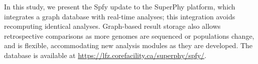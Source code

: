 \documentclass{article}
\begin{document}

In this study, we present the Spfy update to the SuperPhy platform, which integrates a graph database with real-time analyses; this integration avoids recomputing identical analyses. Graph-based result storage also allows retrospective comparisons as more genomes are sequenced or populations change, and is flexible, accommodating new analysis modules as they are developed. The database is available at \url{https://lfz.corefacility.ca/superphy/spfy/}.



\enlargethispage{-65.1pt}

\end{document}
